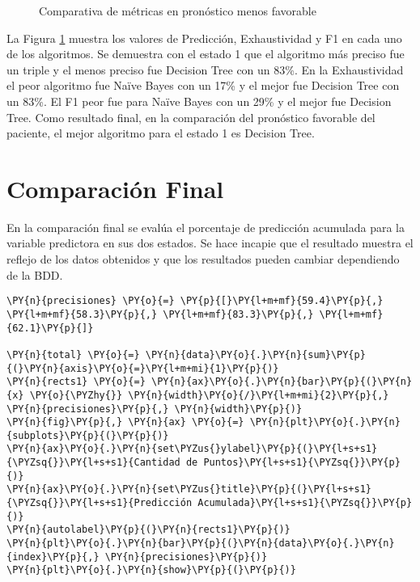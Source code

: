 \begin{center}
    	\begin{figure}[H]
	\centering
	\caption{Comparativa de métricas en pronóstico menos favorable}
	\label{fig:cmpmf}
	\end{figure}
\end{center}
    
   La Figura \ref{fig:cmpmf} muestra los valores de Predicción, Exhaustividad y F1 en cada uno de los algoritmos. Se demuestra con el estado 1 que el algoritmo más preciso fue un triple y el menos preciso fue Decision Tree con un 83\%. En la Exhaustividad el peor algoritmo fue Naïve Bayes con un 17\% y el mejor fue Decision Tree con un 83\%. El F1 peor fue para Naïve Bayes con un 29\% y el mejor fue Decision Tree.
    Como resultado final, en la comparación del pronóstico favorable del paciente, el mejor algoritmo para el estado 1 es Decision Tree.

    \hypertarget{comparaciuxf3n-final}{%
\section{Comparación Final}\label{comparaciuxf3n-final}}

	En la comparación final se evalúa el porcentaje de predicción acumulada para la variable predictora en sus dos estados. Se hace incapie que el resultado muestra el reflejo de los datos obtenidos y que los resultados pueden cambiar dependiendo de la BDD.

    \begin{tcolorbox}[breakable, size=fbox, boxrule=1pt, pad at break*=1mm,colback=cellbackground, colframe=cellborder]
\begin{Verbatim}[commandchars=\\\{\}]
\PY{n}{precisiones} \PY{o}{=} \PY{p}{[}\PY{l+m+mf}{59.4}\PY{p}{,} \PY{l+m+mf}{58.3}\PY{p}{,} \PY{l+m+mf}{83.3}\PY{p}{,} \PY{l+m+mf}{62.1}\PY{p}{]}

\PY{n}{total} \PY{o}{=} \PY{n}{data}\PY{o}{.}\PY{n}{sum}\PY{p}{(}\PY{n}{axis}\PY{o}{=}\PY{l+m+mi}{1}\PY{p}{)}
\PY{n}{rects1} \PY{o}{=} \PY{n}{ax}\PY{o}{.}\PY{n}{bar}\PY{p}{(}\PY{n}{x} \PY{o}{\PYZhy{}} \PY{n}{width}\PY{o}{/}\PY{l+m+mi}{2}\PY{p}{,} \PY{n}{precisiones}\PY{p}{,} \PY{n}{width}\PY{p}{)}
\PY{n}{fig}\PY{p}{,} \PY{n}{ax} \PY{o}{=} \PY{n}{plt}\PY{o}{.}\PY{n}{subplots}\PY{p}{(}\PY{p}{)}
\PY{n}{ax}\PY{o}{.}\PY{n}{set\PYZus{}ylabel}\PY{p}{(}\PY{l+s+s1}{\PYZsq{}}\PY{l+s+s1}{Cantidad de Puntos}\PY{l+s+s1}{\PYZsq{}}\PY{p}{)}
\PY{n}{ax}\PY{o}{.}\PY{n}{set\PYZus{}title}\PY{p}{(}\PY{l+s+s1}{\PYZsq{}}\PY{l+s+s1}{Predicción Acumulada}\PY{l+s+s1}{\PYZsq{}}\PY{p}{)}
\PY{n}{autolabel}\PY{p}{(}\PY{n}{rects1}\PY{p}{)}
\PY{n}{plt}\PY{o}{.}\PY{n}{bar}\PY{p}{(}\PY{n}{data}\PY{o}{.}\PY{n}{index}\PY{p}{,} \PY{n}{precisiones}\PY{p}{)}
\PY{n}{plt}\PY{o}{.}\PY{n}{show}\PY{p}{(}\PY{p}{)}
\end{Verbatim}
\end{tcolorbox}


